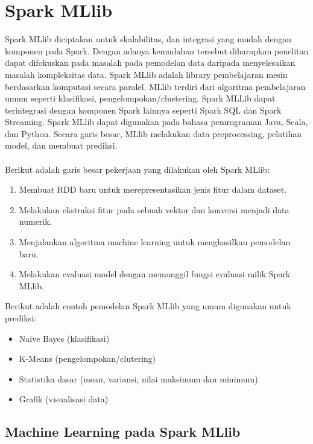 \section{Spark MLlib}
Spark MLlib diciptakan untuk skalabilitas, dan integrasi yang mudah dengan komponen pada Spark. Dengan adanya kemudahan tersebut diharapkan penelitan dapat difokuskan pada masalah pada pemodelan data daripada menyelesaikan masalah kompleksitas data. Spark MLlib adalah library pembelajaran mesin berdasarkan komputasi secara paralel. MLlib terdiri dari algoritma pembelajaran umum seperti klasifikasi,  pengelompokan/clustering. Spark MLLib dapat terintegrasi dengan komponen Spark lainnya seperti Spark SQL dan Spark Streaming. Spark MLlib dapat digunakan pada bahasa pemrograman Java, Scala, dan Python. Secara garis besar, MLlib melakukan data preprocessing, pelatihan model, dan membuat prediksi.
\\\\
Berikut adalah garis besar pekerjaan yang dilakukan oleh Spark MLlib:

\begin{enumerate}
\item Membuat RDD baru untuk merepresentasikan jenis fitur dalam dataset.
\item Melakukan ekstraksi fitur pada sebuah vektor dan konversi menjadi data numerik.
\item Menjalankan algoritma machine learning untuk menghasilkan pemodelan baru.
\item Melakukan evaluasi model dengan memanggil fungsi evaluasi milik Spark MLlib.
\end{enumerate}

\noindent Berikut adalah contoh pemodelan Spark MLlib yang umum digunakan untuk prediksi:

\begin{itemize}
\item Naive Bayes (klasifikasi)
\item K-Means (pengelompokan/clutering)
\item Statistika dasar (mean, variansi, nilai maksimum dan minimum)
\item Grafik (visualisasi data)
\end{itemize}

\subsection{Machine Learning pada Spark MLlib}

